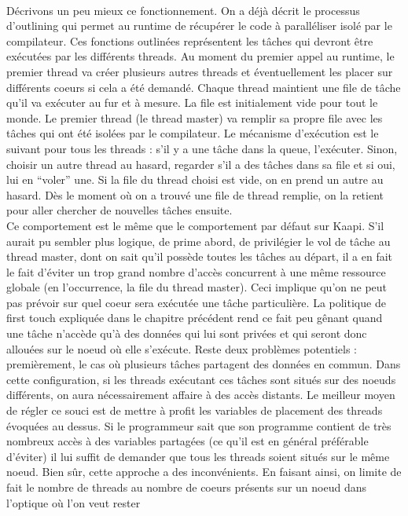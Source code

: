\documentclass{report}
\begin{document}
\\Décrivons un peu mieux ce fonctionnement. On a déjà décrit le processus d'outlining qui permet au
runtime de récupérer le code à paralléliser isolé par le compilateur. Ces fonctions outlinées 
représentent les tâches qui devront être exécutées par les différents threads. Au moment du premier
appel au runtime, le premier thread va créer plusieurs autres threads et éventuellement les placer
sur différents coeurs si cela a été demandé. Chaque thread maintient une file de tâche qu'il va
exécuter au fur et à mesure. La file est initialement vide pour tout le monde. Le premier thread
(le thread master) va remplir sa propre file avec les tâches qui ont été isolées par le compilateur.
Le mécanisme d'exécution est le suivant pour tous les threads : s'il y a une tâche dans la queue,
l'exécuter. Sinon, choisir un autre thread au hasard, regarder s'il a des tâches dans sa file et si
oui, lui en ``voler'' une. Si la file du thread choisi est vide, on en prend un autre au hasard. 
Dès le moment où on a trouvé une file de thread remplie, on la retient pour aller chercher de 
nouvelles tâches ensuite. 
\\Ce comportement est le même que le comportement par défaut sur Kaapi. S'il aurait pu sembler
plus logique, de prime abord, de privilégier le vol de tâche au thread master, dont on sait
qu'il possède toutes les tâches au départ, il a en fait le fait d'éviter un trop grand 
nombre d'accès concurrent à une même ressource globale (en l'occurrence, la file du thread
master). Ceci implique qu'on ne peut pas prévoir sur quel coeur sera exécutée une tâche 
particulière. La politique de first touch expliquée dans le chapitre précédent rend ce 
fait peu gênant quand une tâche n'accède qu'à des données qui lui sont privées et qui seront
donc allouées sur le noeud où elle s'exécute. Reste deux problèmes potentiels : premièrement,
le cas où plusieurs tâches partagent des données en commun. Dans cette configuration, si les
threads exécutant ces tâches sont situés sur des noeuds différents, on aura nécessairement
affaire à des accès distants. Le meilleur moyen de régler ce souci est de mettre à profit
les variables de placement des threads évoquées au dessus. Si le programmeur sait que son
programme contient de très nombreux accès à des variables partagées (ce qu'il est en général
préférable d'éviter) il lui suffit de demander que tous les threads soient situés sur le même
noeud. Bien sûr, cette approche a des inconvénients. En faisant ainsi, on limite de fait le
nombre de threads au nombre de coeurs présents sur un noeud dans l'optique où l'on veut rester
\end{document}
